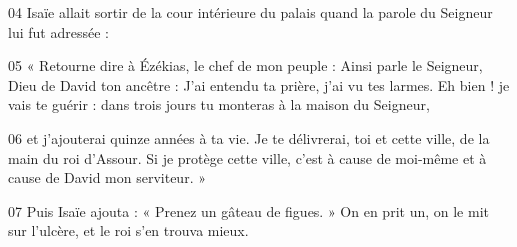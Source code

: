
04 Isaïe allait sortir de la cour intérieure du palais quand la parole du Seigneur lui fut adressée :

05 « Retourne dire à Ézékias, le chef de mon peuple : Ainsi parle le Seigneur, Dieu de David ton ancêtre : J’ai entendu ta prière, j’ai vu tes larmes. Eh bien ! je vais te guérir : dans trois jours tu monteras à la maison du Seigneur,

06 et j’ajouterai quinze années à ta vie. Je te délivrerai, toi et cette ville, de la main du roi d’Assour. Si je protège cette ville, c’est à cause de moi-même et à cause de David mon serviteur. »

07 Puis Isaïe ajouta : « Prenez un gâteau de figues. » On en prit un, on le mit sur l’ulcère, et le roi s’en trouva mieux.
